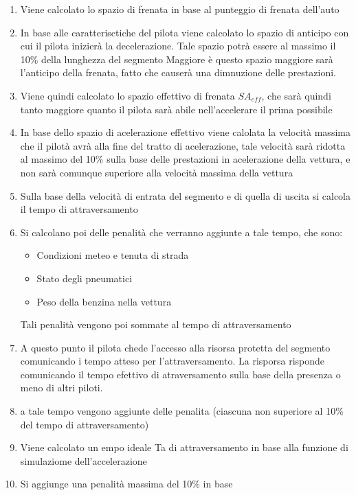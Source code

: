 \documentclass[a4paper,11pt, twoside]{book}
\begin{document}
	    \begin{enumerate}
	      \item Viene calcolato lo spazio di frenata in base al punteggio di frenata dell'auto
	      \item In base alle caratterisctiche del pilota viene calcolato lo spazio di anticipo con cui il
		    pilota inizierà la decelerazione. Tale spazio potrà essere al massimo il 10\% della lunghezza del segmento
		    Maggiore è questo spazio maggiore sarà l'anticipo della frenata, fatto che causerà una dimnuzione delle prestazioni.
		    
	      \item Viene quindi calcolato lo spazio effettivo di frenata $SA_{eff}$, che sarà quindi tanto maggiore quanto
		    il pilota sarà abile nell'accelerare il prima possibile
	      \item In base dello spazio di acelerazione effettivo viene calolata la velocità massima che il pilotà avrà alla fine del 
		    tratto di acelerazione,
		    tale velocità sarà ridotta al massimo del 10\% sulla base delle prestazioni in acelerazione della vettura,
		    e non sarà comunque superiore alla velocità massima della vettura
	      \item Sulla base della velocità di entrata del segmento e di quella di uscita si calcola il tempo di attraversamento
	      \item Si calcolano poi delle penalità che verranno aggiunte a tale tempo, che sono:
		    \begin{itemize}
		      \item Condizioni meteo e tenuta di strada
		      \item Stato degli pneumatici
		      \item Peso della benzina nella vettura
		    \end{itemize}
		    Tali penalità vengono poi sommate al tempo di attraversamento
	      \item A questo punto il pilota chede l'accesso alla risorsa protetta del segmento
		    comunicando i tempo atteso per l'attraversamento. La risporsa risponde comunicando il tempo
		    efettivo di atraversamento sulla base della presenza o meno di altri piloti.
	      
	      \item a tale tempo vengono aggiunte delle penalita (ciascuna non superiore al 10\% del tempo di attraversamento)
	      \item Viene calcolato un empo ideale Ta di attraversamento in base alla funzione di simulaziome dell'accelerazione
	      \item Si aggiunge una penalità massima del 10\% in base  
	    \end{enumerate}
\end{document}
